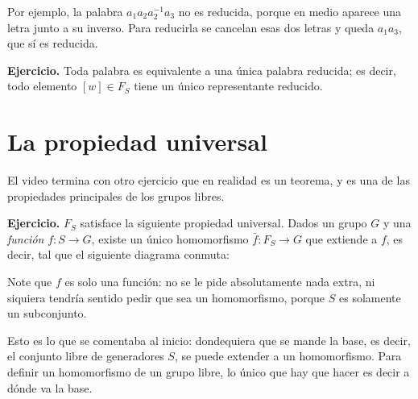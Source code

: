 \documentclass[11pt]{article}
\begin{document}
Por ejemplo, la palabra $a_1a_2a_2^{-1}a_3$ no es reducida, porque en medio aparece una letra junto a su inverso. Para reducirla se cancelan esas dos letras y queda $a_1a_3$, que sí es reducida.

\medskip\noindent\textbf{Ejercicio.} Toda palabra es equivalente a una única palabra reducida; es decir, todo elemento $[w]\in F_S$ tiene un único representante reducido.

\section*{La propiedad universal}

El video termina con otro ejercicio que en realidad es un teorema, y es una de las propiedades principales de los grupos libres.

\medskip\noindent\textbf{Ejercicio.} $F_S$ satisface la siguiente propiedad universal. Dados un grupo $G$ y una \emph{función} $f\colon S\to G$, existe un único homomorfismo $\bar f\colon F_S\to G$ que extiende a $f$, es decir, tal que el siguiente diagrama conmuta:
\begin{center}
\end{center}
Note que $f$ es solo una función: no se le pide absolutamente nada extra, ni siquiera tendría sentido pedir que sea un homomorfismo, porque $S$ es solamente un subconjunto.

Esto es lo que se comentaba al inicio: dondequiera que se mande la base, es decir, el conjunto libre de generadores $S$, se puede extender a un homomorfismo. Para definir un homomorfismo de un grupo libre, lo único que hay que hacer es decir a dónde va la base.

\begin{erratas}
\end{erratas}
\end{document}
